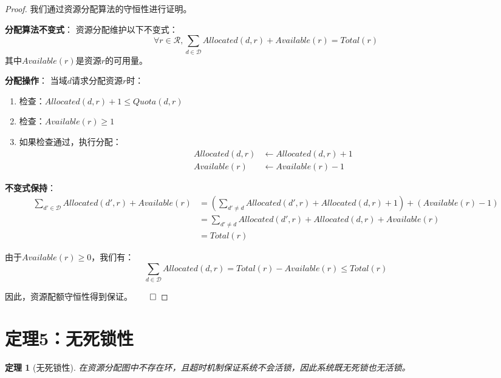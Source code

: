 \documentclass{article}
\newtheorem{theorem}{定理}[section]
\theoremstyle{definition}
\theoremstyle{remark}
\begin{document}
\begin{proof}
    我们通过资源分配算法的守恒性进行证明。

    \textbf{分配算法不变式}：
    资源分配维护以下不变式：
    \[
    \forall r \in \mathcal{R}, \sum_{d \in \mathcal{D}} Allocated(d, r) + Available(r) = Total(r)
    \]
    其中$Available(r)$是资源$r$的可用量。

    \textbf{分配操作}：
    当域$d$请求分配资源$r$时：
    \begin{enumerate}
        \item 检查：$Allocated(d, r) + 1 \leq Quota(d, r)$
        \item 检查：$Available(r) \geq 1$
        \item 如果检查通过，执行分配：
        \begin{align*}
            Allocated(d, r) &\leftarrow Allocated(d, r) + 1 \\
            Available(r) &\leftarrow Available(r) - 1
        \end{align*}
    \end{enumerate}

    \textbf{不变式保持}：
    \begin{align*}
        \sum_{d' \in \mathcal{D}} Allocated(d', r) + Available(r) &=
        \left(\sum_{d' \neq d} Allocated(d', r) + Allocated(d, r) + 1\right) + (Available(r) - 1) \\
        &= \sum_{d' \neq d} Allocated(d', r) + Allocated(d, r) + Available(r) \\
        &= Total(r)
    \end{align*}

    由于$Available(r) \geq 0$，我们有：
    \[
    \sum_{d \in \mathcal{D}} Allocated(d, r) = Total(r) - Available(r) \leq Total(r)
    \]

    因此，资源配额守恒性得到保证。$\qed$
\end{proof}

\section{定理5：无死锁性}

\begin{theorem}[无死锁性]
    在资源分配图中不存在环，且超时机制保证系统不会活锁，因此系统既无死锁也无活锁。
\end{theorem}
\end{document}
